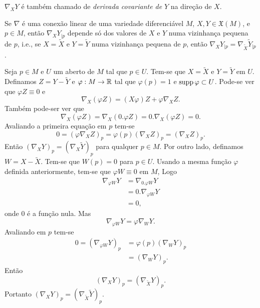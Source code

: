 \begin{observacao}
	$\nabla_X Y$ é também chamado de \emph{derivada covariante de} $Y$ na direção de $X$.
\end{observacao}

\begin{proposicao}\label{boa_definicao_conexao_1}
	Se $\nabla$ é uma conexão linear de uma variedade diferenciável $M$, $X,Y \in \mathfrak{X}(M)$, e $p \in M$, então $\nabla_X Y_{|p}$ depende só dos valores de $X$ e $Y$ numa vizinhança pequena de $p$, i.e., se $X = \tilde{X}$ e $Y = \tilde{Y}$ numa vizinhança pequena de $p$, então $\nabla_X Y_{|p} = \nabla_{\tilde{X}} \tilde{Y}_{|p}$.
\end{proposicao}

\begin{demonstracao}
	Seja $p \in M$ e $U$ um aberto de $M$ tal que $p \in U$. Tem-se que $X = \tilde{X}$ e $Y = \tilde{Y}$ em $U$. Definamos $Z = Y - \tilde{Y}$ e $\varphi: M \rightarrow \mathbb{R}$ tal que $\varphi(p)=1$ e $\operatorname{supp} \varphi \subset U$. Pode-se ver que $\varphi Z \equiv 0$ e
	\begin{equation*}
		\nabla_X (\varphi Z) = (X \varphi) Z + \varphi \nabla_X Z.
	\end{equation*}
	Também pode-ser ver que
	\begin{equation*}
		\nabla_X (\varphi Z)  = \nabla_X (0 . \varphi Z) = 0 . \nabla_X (\varphi Z) = 0.
	\end{equation*}
	Avaliando a primeira equação em $p$ tem-se
	\begin{equation*}
		0 = (\varphi \nabla_X Z)_p = \varphi(p) (\nabla_X Z)_p = (\nabla_X Z)_p.
	\end{equation*}
	Então $(\nabla_X Y)_p = (\nabla_X \tilde{Y})_p$ para qualquer $p \in M$.
	Por outro lado, definamos $W = X - \tilde{X}$. Tem-se que $W(p) = 0$ para $p \in U$. Usando a mesma função $\varphi$ definida anteriormente, tem-se que $\varphi W \equiv 0$ em $M$, Logo
	\begin{align*}
		\nabla_{\varphi W} Y &= \nabla_{0 . \varphi W} Y\\
		&= 0 . \nabla_{\varphi W} Y\\
		&= 0,
	\end{align*}
	onde $0$ é a função nula. Mas
	\begin{equation*}
		\nabla_{\varphi W} Y = \varphi \nabla_W Y.
	\end{equation*}
	Avaliando em $p$ tem-se
	\begin{align*}
		0 = (\nabla_{\varphi W} Y)_p &= \varphi(p) (\nabla_W Y)_p\\
		&= (\nabla_W Y)_p.
	\end{align*}
	Então
	\begin{equation*}
		(\nabla_X Y)_p = (\nabla_{\tilde{X}} Y)_p.
	\end{equation*}
	Portanto $(\nabla_X Y)_p = (\nabla_{\tilde{X}} \tilde{Y})_p$.
\end{demonstracao}

